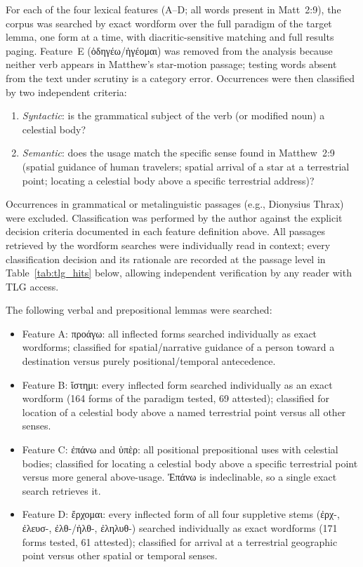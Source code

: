 \documentclass[11pt,a4paper]{article}
\newcommand{\grk}[1]{{\fontencoding{LGR}\selectfont #1}}
\newcommand{\grk}[1]{{\greekfont #1}}
\begin{document}
For each of the four lexical features (A--D; all words present in Matt~2:9),
the corpus was searched by exact wordform over the full paradigm of the target
lemma, one form at a time, with diacritic-sensitive matching and full results
paging. Feature~E (\grk{ὁδηγέω}/\grk{ἡγέομαι}) was removed
from the analysis because neither verb appears in Matthew's star-motion passage;
testing words absent from the text under scrutiny is a category error.
Occurrences were then classified by two independent criteria:
\begin{enumerate}
  \item \textit{Syntactic}: is the grammatical subject of the verb (or
    modified noun) a celestial body?
  \item \textit{Semantic}: does the usage match the specific sense found in
    Matthew~2:9 (spatial guidance of human travelers; spatial arrival of a
    star at a terrestrial point; locating a celestial body above a specific
    terrestrial address)?
\end{enumerate}
Occurrences in grammatical or metalinguistic passages (e.g., Dionysius
Thrax) were excluded. Classification was performed by the author against
the explicit decision criteria documented in each feature definition above.
All passages retrieved by the wordform searches were individually read in
context;
every classification decision and its rationale are recorded at the passage
level in Table~\ref{tab:tlg_hits} below, allowing independent verification by
any reader with TLG access.

The following verbal and prepositional lemmas were searched:

\begin{itemize}
  \item Feature A: \grk{προάγω}: all inflected forms searched individually
    as exact wordforms; classified for spatial/narrative guidance of a
    person toward a destination versus purely positional/temporal
    antecedence.
  \item Feature B: \grk{ἵστημι}: every inflected form searched
    individually as an exact wordform (164 forms of the paradigm tested,
    69 attested); classified for location of a celestial body above a
    named terrestrial point versus all other senses.
  \item Feature C: \grk{ἐπάνω} and \grk{ὑπὲρ}: all positional prepositional
    uses with celestial bodies; classified for locating a celestial body
    above a specific terrestrial point versus more general above-usage.
    \grk{Ἐπάνω} is indeclinable, so a single exact search retrieves it.
  \item Feature D: \grk{ἔρχομαι}: every inflected form of all four
    suppletive stems (\grk{ἐρχ-}, \grk{ἐλευσ-}, \grk{ἐλθ-/ἠλθ-},
    \grk{ἐληλυθ-}) searched individually as exact wordforms (171 forms
    tested, 61 attested); classified for arrival at a terrestrial
    geographic point versus other spatial or temporal senses.
\end{itemize}
\end{document}
